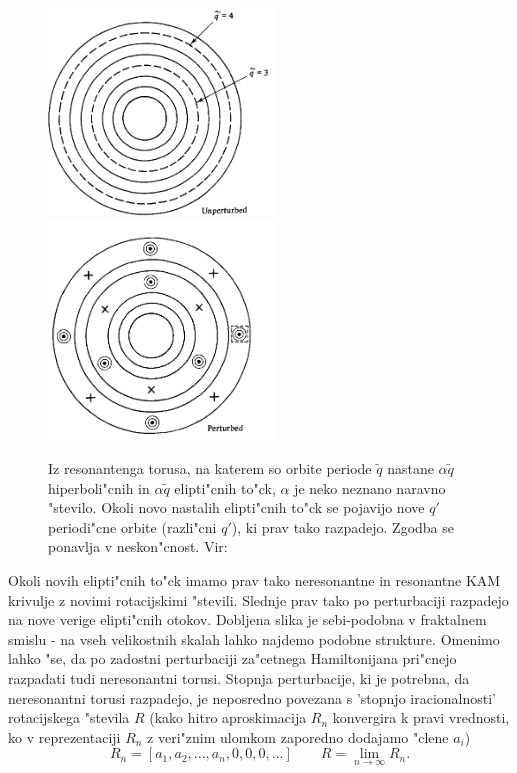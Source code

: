 \documentclass[]{article}
\begin{document}
\begin{figure}[!htb]
	\begin{center}
		\includegraphics[width = 6cm]{6}
		\includegraphics[width = 6cm]{7}
		\caption{Iz resonantenga torusa, na katerem so orbite periode $\tilde{q}$ nastane $\alpha\tilde{q}$ hiperboli"cnih in $\alpha\tilde{q}$ elipti"cnih to"ck, $\alpha$ je neko neznano naravno "stevilo. Okoli novo nastalih elipti"cnih to"ck se pojavijo nove $q'$ periodi"cne orbite (razli"cni $q'$), ki prav tako razpadejo. Zgodba se ponavlja v neskon"cnost. Vir: \cite{1}}
		\label{slika 5}
	\end{center}
\end{figure}
Okoli novih elipti"cnih to"ck imamo prav tako neresonantne in resonantne KAM krivulje z novimi rotacijskimi "stevili. Slednje prav tako po perturbaciji razpadejo na nove verige elipti"cnih otokov. Dobljena slika je sebi-podobna v fraktalnem smislu - na vseh velikostnih skalah lahko najdemo podobne strukture.
Omenimo lahko "se, da po zadostni perturbaciji za"cetnega Hamiltonijana pri"cnejo razpadati tudi neresonantni torusi. Stopnja perturbacije, ki je potrebna, da neresonantni torusi razpadejo, je neposredno povezana s 'stopnjo iracionalnosti' rotacijskega "stevila $R$ (kako hitro aproskimacija $R_n$ konvergira k pravi vrednosti, ko v reprezentaciji $R_n$ z veri"znim ulomkom zaporedno dodajamo "clene $a_i$)
\begin{equation}\label{9}
R_n=[a_1,a_2,...,a_n,0,0,0,...]\qquad R=\lim\limits_{n\to\infty}R_n.
\end{equation}
\end{document}
